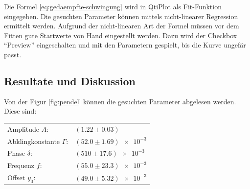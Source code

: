 Die Formel \ref{eq:gedaempfte-schwingung} wird in QtiPlot als Fit-Funktion eingegeben. Die gesuchten
Parameter k\"onnen mittels nicht-linearer Regression ermittelt werden. Aufgrund der nicht-linearen Art
der Formel m\"ussen vor dem Fitten gute Startwerte von Hand eingestellt werden. Dazu wird der Checkbox
``Preview'' eingeschalten und mit den Parametern gespielt, bis die Kurve ungef\"ar passt.


\subsection{Resultate und Diskussion}

Von der Figur \ref{fig:pendel} k\"onnen die gesuchten Parameter abgelesen werden. Diese sind:
\begin{center}
    \begin{tabular}{ll}
        Amplitude $A$:              &  $(1.22 \pm 0.03)$         \\
        Abklingkonstante $\Gamma$:  &  $(52.0 \pm 1.69)\num{e-3}$ \\
        Phase $\delta$:             &  $(510  \pm 17.6)\num{e-3}$ \\
        Frequenz $f$:               &  $(55.0 \pm 23.3)\num{e-3}$ \\
        Offset $y_0$:               &  $(49.0 \pm 5.32)\num{e-3}$ \\
    \end{tabular}
\end{center}

